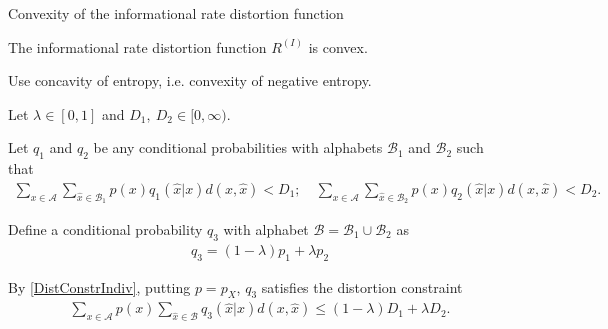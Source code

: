 \begin{frame}{Convexity of the informational rate distortion function}
\begin{proposition}[Convexity of $R^{(I)}$]
The informational rate distortion function $R^{(I)}$ is convex.
\end{proposition}
\vspace{-2.9mm}
\bit
\item {} Use concavity of entropy, i.e. convexity of negative entropy. 
\item Let $\lambda\in [0,1]$ and $D_1,\:D_2\in[0,\infty)$. %
%
%
\item Let $q_1$ and $q_2$ be any conditional probabilities with alphabets $\mathcal{B}_1$ and $\mathcal{B}_2$ such that
\begin{align}\label{DistConstrIndiv}
\sum_{x\in\mathcal{A}}\sum_{\hat{x}\in\mathcal{B}_1}p(x)q_1(\hat{x}|x)d(x,\hat{x})<D_1; \quad \sum_{x\in\mathcal{A}}\sum_{\hat{x}\in\mathcal{B}_2}p(x)q_2(\hat{x}|x)d(x,\hat{x})<D_2.
\end{align}

\item Define a conditional probability $q_3$ with alphabet $\mathcal{B}=\mathcal{B}_1\cup\mathcal{B}_2$ as 
\begin{align*}
q_3=(1-\lambda)p_1+\lambda p_2
\end{align*}
\item By \eqref{DistConstrIndiv}, putting $p=p_X$, $q_3$ satisfies the distortion constraint
\begin{align}\label{DistConstrQ3}
\sum_{x\in\mathcal{A}}p(x)\sum_{\hat{x}\in\mathcal{B}}q_3(\hat{x}|x)d(x,\hat{x}) \leq (1-\lambda)D_1+\lambda D_2. 
\end{align}
\eit
\end{frame}


